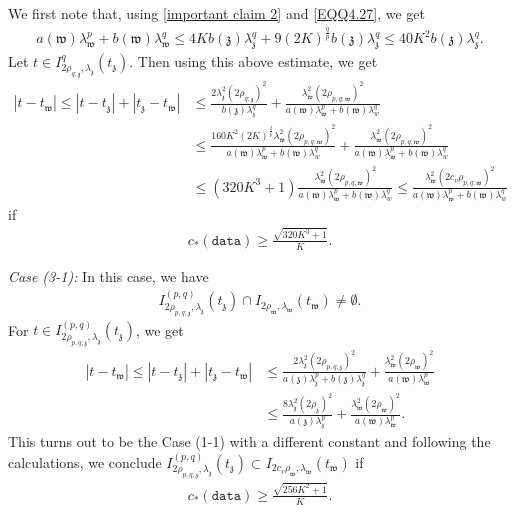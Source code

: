 \documentclass[11pt,oneside, english,reqno,twoside a4paper]{amsart}
\theoremstyle{definition}
\numberwithin{theorem}{section}
\numberwithin{equation}{section}
\newcommand{\mfz}{\mathfrak{z}}
\newcommand{\mfw}{\mathfrak{w}}
\begin{document}
We first note that, using \eqref{important claim 2} and \eqref{EQQ4.27}, we get
\begin{align*}
    a(\mfw)\lambda^p_{\mfw}+b(\mfw)\lambda^q_{\mfw}\leq 4K b(\mfz)\lambda^q_{\mfz}+9(2K)^{\frac{q}{p}}b(\mfz)\lambda^q_{\mfz}\leq 40K^2 b(\mfz)\lambda^q_{\mfz}.
\end{align*}
Let $t \in I^q_{2\rho_{q;\mathfrak{z}}, \lambda_{\mathfrak{z}}}(t_{\mathfrak{z}}).$ Then using this above estimate, we get
\begin{align*}
 |t-t_{\mathfrak{w}}|\leq |t-t_{\mathfrak{z}}|+|t_{\mathfrak{z}}-t_{\mathfrak{w}}|&\leq \frac{2\lambda^{2}_{\mathfrak{z}}(2\rho_{q;\mathfrak{z}})^2}{b(\mathfrak{z})\lambda^q_{\mfz}}+\frac{\lambda^2_{\mathfrak{w}}(2\rho_{p,q; \mathfrak{w}})^2}{a(\mathfrak{w})\lambda^p_{\mathfrak{w}}+b(\mathfrak{w})\lambda^q_{w}}\\
 &\leq \frac{160K^2(2K)^{\frac{2}{p}}\lambda^2_{\mfw}(2\rho_{p,q; \mfw})^2}{a(\mathfrak{w})\lambda^p_{\mathfrak{w}}+b(\mathfrak{w})\lambda^q_{w}}+\frac{\lambda^2_{\mathfrak{w}}(2\rho_{p,q; \mathfrak{w}})^2}{a(\mathfrak{w})\lambda^p_{\mathfrak{w}}+b(\mathfrak{w})\lambda^q_{w}}\\
 &\leq (320K^3+1)\frac{\lambda^2_{\mathfrak{w}}(2\rho_{p,q; \mathfrak{w}})^2}{a(\mathfrak{w})\lambda^p_{\mathfrak{w}}+b(\mathfrak{w})\lambda^q_{w}}\leq \frac{\lambda^2_{\mathfrak{w}}(2c_v\rho_{p,q; \mathfrak{w}})^2}{a(\mathfrak{w})\lambda^p_{\mathfrak{w}}+b(\mathfrak{w})\lambda^q_{w}}
\end{align*}
if
\begin{align}\label{c_6}
    c_*(\texttt{data})\geq \frac{\sqrt{320K^3+1}}{K}.
\end{align}

\noindent \textit{Case (3-1):} In this case, we have
\begin{align*}
    I^{(p,q)}_{2\rho_{p,q; \mfz}, \lambda_{\mfz}}(t_{\mfz})\cap I_{2\rho_{\mfw}, \lambda_{\mfw}}(t_{\mfw})\neq \emptyset.
\end{align*}
For $t \in I^{(p,q)}_{2\rho_{p,q; \mfz}, \lambda_{\mfz}}(t_{\mfz})$, we get
\begin{align*}
    |t-t_{\mfw}|\leq |t-t_{\mfz}|+|t_{\mfz}-t_{\mfw}|&\leq  \frac{2 \lambda^2_{\mfz}(2 \rho_{p,q; \mfz})^2}{a(\mfz)\lambda^p_{\mfz}+b(\mfz)\lambda^q_{\mfz}}+\frac{ \lambda^2_{\mfw}(2 \rho_{\mfw})^2}{a(\mfw)\lambda^p_{\mfw}}\\
    &\leq \frac{8 \lambda^2_{\mfz}(2 \rho_{\mfz})^2}{a(\mfz)\lambda^p_{\mfz}}+\frac{ \lambda^2_{\mfw}(2 \rho_{\mfw})^2}{a(\mfw)\lambda^p_{\mfw}}.
\end{align*}
This turns out to be the Case (1-1) with a different constant and following the calculations, we conclude $I^{(p,q)}_{2\rho_{p,q; \mfz}, \lambda_{\mfz}}(t_{\mfz})\subset I_{2c_v\rho_{\mfw}, \lambda_{\mfw}}(t_{\mfw})$ if 
\begin{align}\label{c_7}
    c_*(\texttt{data})\geq \frac{\sqrt{256K^2+1}}{K}.
\end{align}
\end{document}
